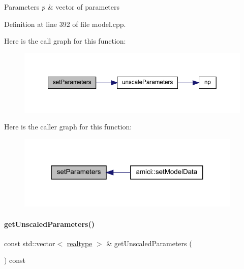 \begin{DoxyParams}{Parameters}
{\em p} & vector of parameters \\
\hline
\end{DoxyParams}


Definition at line 392 of file model.\+cpp.

Here is the call graph for this function\+:
\nopagebreak
\begin{figure}[H]
\begin{center}
\leavevmode
\includegraphics[width=350pt]{classamici_1_1_model_af1e95f6479d442fcb4c63d16763d4acd_cgraph}
\end{center}
\end{figure}
Here is the caller graph for this function\+:
\nopagebreak
\begin{figure}[H]
\begin{center}
\leavevmode
\includegraphics[width=304pt]{classamici_1_1_model_af1e95f6479d442fcb4c63d16763d4acd_icgraph}
\end{center}
\end{figure}
\mbox{\label{classamici_1_1_model_a76f62d983fb3842cb695681f7ed9a9f0}} 
\paragraph{\texorpdfstring{get\+Unscaled\+Parameters()}{getUnscaledParameters()}}
{\footnotesize\ttfamily const std\+::vector$<$ \mbox{\hyperlink{namespaceamici_a1bdce28051d6a53868f7ccbf5f2c14a3}{realtype}} $>$ \& get\+Unscaled\+Parameters (\begin{DoxyParamCaption}{ }\end{DoxyParamCaption}) const}


